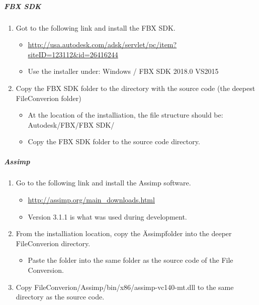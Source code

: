 \subparagraph{FBX SDK}

\begin{enumerate}
    \item Got to the following link and install the FBX SDK.
    \begin{itemize}
        \item \url{http://usa.autodesk.com/adsk/servlet/pc/item?siteID=123112&id=26416244}
        \item Use the installer under: Windows / FBX SDK 2018.0 VS2015
    \end{itemize}

    \item Copy the FBX SDK folder to the directory with the source code (the deepest FileConverion folder)
    \begin{itemize}
        \item At the location of the installiation, the file structure should be: Autodesk/FBX/FBX SDK/
        \item Copy the FBX SDK folder to the source code directory.
    \end{itemize}
\end{enumerate}

\subparagraph{Assimp}

\begin{enumerate}
    \item Go to the following link and install the Assimp software.
    \begin{itemize}
        \item \url{http://assimp.org/main_downloads.html}
        \item Version 3.1.1 is what was used during development.
    \end{itemize}

    \item From the installiation location, copy the \"Assimp\" folder into the deeper FileConverion directory.
    \begin{itemize}
        \item Paste the folder into the same folder as the source code of the File Conversion.
    \end{itemize}

    \item Copy FileConverion/Assimp/bin/x86/assimp-vc140-mt.dll to the same directory as the source code.
\end{enumerate}
